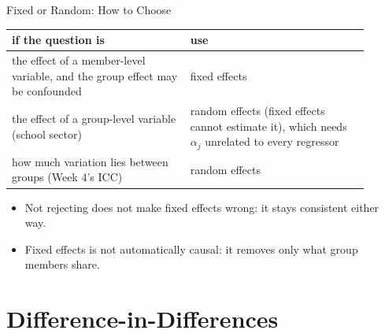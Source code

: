 \documentclass[aspectratio=169,11pt,xcolor=dvipsnames]{beamer}
\begin{document}
\begin{frame}{Fixed or Random: How to Choose}
\begin{center}\small
\renewcommand{\arraystretch}{1.25}
\begin{tabular}{@{}>{\raggedright\arraybackslash}p{0.45\linewidth}>{\raggedright\arraybackslash}p{0.45\linewidth}@{}}
\toprule
if the question is & use \\
\midrule
the effect of a member-level variable, and the group effect may be confounded
  & fixed effects \\
the effect of a group-level variable (school sector)
  & random effects (fixed effects cannot estimate it), which needs $\alpha_j$
    unrelated to every regressor \\
how much variation lies between groups (Week 4's ICC)
  & random effects \\
\bottomrule
\end{tabular}
\end{center}
\vskip4pt
\begin{itemize}\itemsep3pt
  \item Not rejecting does not make fixed effects wrong: it stays consistent either way.
  \item Fixed effects is not automatically causal: it removes only what group
        members share.
\end{itemize}
\end{frame}

\section[DID]{Difference-in-Differences}
\begin{frame}\sectionpage\end{frame}
\end{document}
